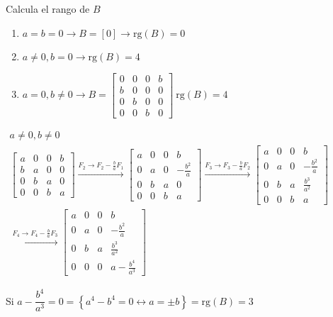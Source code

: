 \begin{enumerate}[label=\color{red}\textbf{\arabic*)},leftmargin=*]
	Calcula el rango de $B$
	
	\begin{enumerate}[label=\color{lightblue}\arabic*)]
		\item $a=b=0\longrightarrow B=[0]\longrightarrow\mathrm{rg}(B)=0$
		\item $a\neq0,b=0\longrightarrow\mathrm{rg}(B)=4$
		\item $a=0,b\neq0\longrightarrow B=\begin{bmatrix}
			0 & 0 & 0 & b \\
			b & 0 & 0 & 0 \\
			0 & b & 0 & 0 \\
			0 & 0 & b & 0
		\end{bmatrix}\:\mathrm{rg}(B)=4$
	\end{enumerate}
	$\begin{array}{l}
		a\neq0,b\neq0\\
		\begin{bmatrix}
			a & 0 & 0 & b \\
			b & a & 0 & 0 \\
			0 & b & a & 0 \\
			0 & 0 & b & a
		\end{bmatrix}\xrightarrow{F_2\to F_2-\frac{b}{a}F_1}\begin{bmatrix}
		a & 0 & 0 & b \\
		0 & a & 0 & -\frac{b^2}{a} \\
		0 & b & a & 0 \\
		0 & 0 & b & a
		\end{bmatrix}\xrightarrow{F_3\to F_3-\frac{b}{a}F_2}\begin{bmatrix}
		a & 0 & 0 & b \\
		0 & a & 0 & -\frac{b^2}{a} \\
		0 & b & a & \frac{b^3}{a^2} \\
		0 & 0 & b & a
		\end{bmatrix}\\
		\xrightarrow{F_4\to F_4-\frac{b}{a}F_3}\begin{bmatrix}
		a & 0 & 0 & b \\
		0 & a & 0 & -\frac{b^2}{a} \\
		0 & b & a & \frac{b^3}{a^2} \\
		0 & 0 & 0 & a-\frac{b^4}{a^3}
		\end{bmatrix}
	\end{array}$
	
	Si $a-\dfrac{b^4}{a^3}=0=\left\{a^4-b^4=0\longleftrightarrow a=\pm b\right\}=\mathrm{rg}(B)=3$
	

\end{enumerate}
